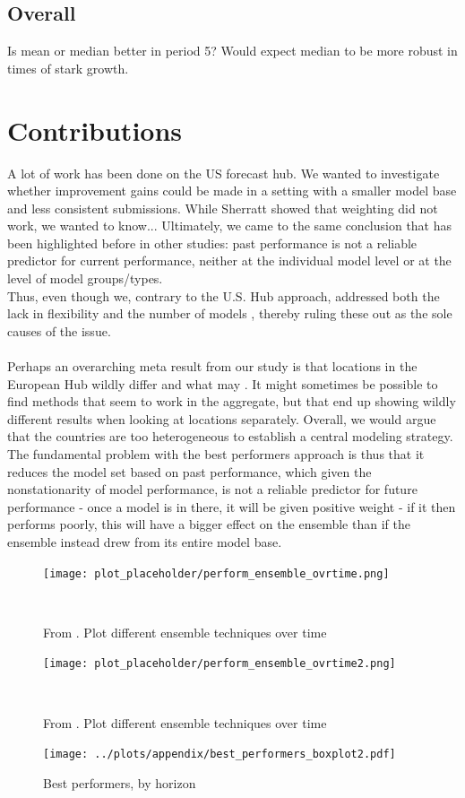 \subsection{Overall}
Is mean or median better in period 5? Would expect median to be more robust in times of stark growth.
\section{Contributions}
A lot of work has been done on the US forecast hub. We wanted to investigate whether improvement gains could be made in a setting with a smaller model base and less consistent submissions. While Sherratt showed that weighting did not work, we wanted to know... Ultimately, we came to the same conclusion that has been highlighted before in other studies: past performance is not a reliable predictor for current performance, neither at the individual model level or at the level of model groups/types. \\
Thus, even though we, contrary to the U.S. Hub approach, addressed both the lack in flexibility and the number of models , thereby ruling these out as the sole causes of the issue.\\\\
Perhaps an overarching meta result from our study is that locations in the European Hub wildly differ and what may . It might sometimes be possible to find methods that seem to work in the aggregate, but that end up showing wildly different results when looking at locations separately. Overall, we would argue that the countries are too heterogeneous to establish a central modeling strategy.\\
The fundamental problem with the best performers approach is thus that it reduces the model set based on past performance, which given the nonstationarity of model performance, is not a reliable predictor for future performance - once a model is in there, it will be given positive weight - if it then performs poorly, this will have a bigger effect on the ensemble than if the ensemble instead drew from its entire model base.\\

\begin{figure}
\centering
\texttt{[image: plot\_placeholder/perform\_ensemble\_ovrtime.png]}
\caption{From \cite{ray_ensemble_2020}. Plot different ensemble techniques over time}
\
\end{figure}
\begin{figure}
\centering
\texttt{[image: plot\_placeholder/perform\_ensemble\_ovrtime2.png]}
\caption{From \cite{ray_ensemble_2020}. Plot different ensemble techniques over time}
\
\end{figure}



\appendix
\begin{figure}
\centering
\texttt{[image: ../plots/appendix/best\_performers\_boxplot2.pdf]}
\caption{Best performers, by horizon}
\label{fig:best_performers_by_horizon}
\end{figure}


